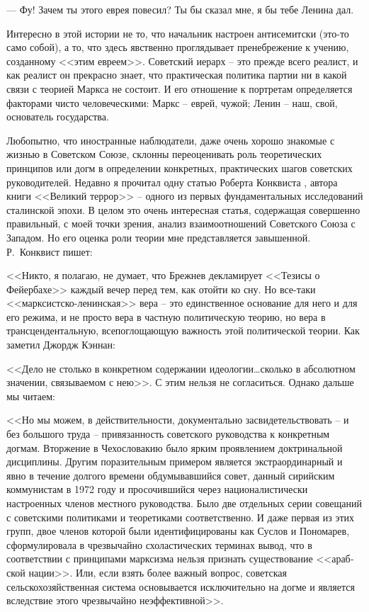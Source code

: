 \documentclass{book}
\begin{document}
--- Фу! Зачем ты этого еврея повесил? Ты бы сказал мне, я бы тебе Ленина дал.

Интересно в этой истории не то, что начальник настроен антисемитски (это-то само собой), а то, что здесь явственно проглядывает пренебрежение к учению, созданному <<этим евреем>>. Советский иерарх -- это прежде всего реалист, и как реалист он прекрасно знает, что практическая политика партии ни в какой связи с теорией Маркса не состоит. И его отношение к портретам определяется факторами чисто человеческими: Маркс -- еврей, чужой; Ленин -- наш, свой, основатель государства.

Любопытно, что иностранные наблюдатели, даже очень хорошо знакомые с жизнью в Советском Союзе, склонны переоценивать роль 
теоретических принципов или догм в определении конкретных, практических шагов советских руководителей. Недавно я прочитал одну 
статью Роберта Конквиста%
,
автора книги <<Великий террор>> -- одного из первых фундаментальных исследований сталинской эпохи. 
В целом это очень интересная статья, содержащая совершенно правильный, с моей точки зрения, анализ взаимоотношений Советского 
Союза с Западом. Но его оценка роли теории мне представляется завышенной. Р.~Конквист пишет:

<<Никто, я полагаю, не думает, что Брежнев декламирует <<Тезисы о Фейербахе>> каждый вечер перед тем, как отойти ко сну. Но 
все-таки <<марксистско-ленинская>> вера -- это единственное основание для него и для его режима, и не просто вера в частную 
политическую теорию, но вера в трансцендентальную, всепоглощающую важность этой политической теории. Как заметил Джордж Кэннан: 

<<Дело не столько в конкретном содержании идеологии\ldots сколько в абсолютном значении, связываемом с нею>>. С этим нельзя не согласиться. Однако дальше мы читаем:

<<Но мы можем, в действительности, документально засвидетельствовать -- и без большого труда -- привязанность советского руководства к конкретным догмам. Вторжение в Чехословакию было ярким проявлением доктринальной дисциплины. Другим поразительным примером является экстраординарный и явно в течение долгого времени обдумывавшийся совет, данный сирийским коммунистам в 1972 году и просочившийся через националистически настроенных членов мест­ного руководства. Было две отдельных серии совещаний с советскими политиками и теоретиками соответственно. И даже первая из этих групп, двое членов которой были идентифици­рованы как Суслов и Пономарев, сформулировала в чрезвы­чайно схоластических терминах вывод, что в соответствии с принципами марксизма нельзя признать существование <<араб­ской нации>>. Или, если взять более важный вопрос, советская сельскохозяйственная система основывается исключительно на догме и является вследствие этого чрезвычайно неэффектив­ной>>.
\end{document}
